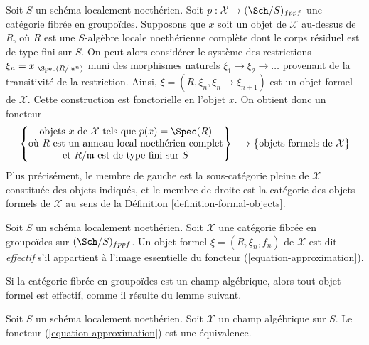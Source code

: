 \noindent
Soit $S$ un schéma localement noethérien. Soit
$p : \mathcal{X} \to (\Sch/S)_{fppf}$ une catégorie fibrée en groupoïdes.
Supposons que $x$ soit un objet de $\mathcal{X}$ au-dessus de $R$, où $R$ est une
$S$-algèbre locale noethérienne complète dont le corps résiduel est de type fini
sur $S$. On peut alors considérer le système des restrictions
$\xi_n = x|_{\Spec(R/\mathfrak m^n)}$ muni des morphismes naturels
$\xi_1 \to \xi_2 \to \ldots$ provenant de la transitivité de la restriction.
Ainsi, $\xi = (R, \xi_n, \xi_n \to \xi_{n + 1})$ est un objet formel de
$\mathcal{X}$. Cette construction est fonctorielle en l'objet $x$.
On obtient donc un foncteur
\begin{equation}
\label{equation-approximation}
\left\{
\begin{matrix}
\text{objets }x\text{ de }\mathcal{X} \text{ tels que }p(x) = \Spec(R) \\
\text{où }R\text{ est un anneau local noethérien complet}\\
\text{et }R/\mathfrak m\text{ est de type fini sur }S
\end{matrix}
\right\}
\longrightarrow
\left\{
\begin{matrix}
\text{objets formels de }\mathcal{X}
\end{matrix}
\right\}
\end{equation}
Plus précisément, le membre de gauche est la sous-catégorie pleine de $\mathcal{X}$
constituée des objets indiqués, et le membre de droite est la catégorie
des objets formels de $\mathcal{X}$ au sens de la
Définition \ref{definition-formal-objects}.

\begin{definition}
\label{definition-effective}
Soit $S$ un schéma localement noethérien. Soit $\mathcal{X}$ une catégorie
fibrée en groupoïdes sur $(\Sch/S)_{fppf}$. Un objet formel
$\xi = (R, \xi_n, f_n)$ de $\mathcal{X}$ est dit {\it effectif}
s'il appartient à l'image essentielle du foncteur
(\ref{equation-approximation}).
\end{definition}

\noindent
Si la catégorie fibrée en groupoïdes est un champ algébrique, alors tout
objet formel est effectif, comme il résulte du lemme suivant.

\begin{lemma}
\label{lemma-effective}
Soit $S$ un schéma localement noethérien. Soit $\mathcal{X}$ un champ algébrique
sur $S$. Le foncteur (\ref{equation-approximation}) est une équivalence.
\end{lemma}

